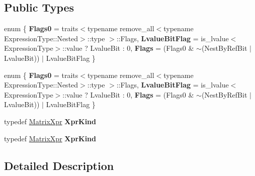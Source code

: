 \subsection*{Public Types}
\begin{DoxyCompactItemize}
\item 
\mbox{\label{struct_eigen_1_1internal_1_1traits_3_01_matrix_wrapper_3_01_expression_type_01_4_01_4_adc3afb0fa2ee62a2a9e33975abed9b67}} 
enum \{ {\bfseries Flags0} = traits$<$typename remove\+\_\+all$<$typename Expression\+Type\+:\+:Nested$>$\+:\+:type $>$\+:\+:Flags, 
{\bfseries Lvalue\+Bit\+Flag} = is\+\_\+lvalue$<$Expression\+Type$>$\+:\+:value ? Lvalue\+Bit \+: 0, 
{\bfseries Flags} = (Flags0 \& $\sim$(Nest\+By\+Ref\+Bit $\vert$ Lvalue\+Bit)) $\vert$ Lvalue\+Bit\+Flag
 \}
\item 
\mbox{\label{struct_eigen_1_1internal_1_1traits_3_01_matrix_wrapper_3_01_expression_type_01_4_01_4_ac30ca49ecdc1258e2e53b6a0713370b7}} 
enum \{ {\bfseries Flags0} = traits$<$typename remove\+\_\+all$<$typename Expression\+Type\+:\+:Nested$>$\+:\+:type $>$\+:\+:Flags, 
{\bfseries Lvalue\+Bit\+Flag} = is\+\_\+lvalue$<$Expression\+Type$>$\+:\+:value ? Lvalue\+Bit \+: 0, 
{\bfseries Flags} = (Flags0 \& $\sim$(Nest\+By\+Ref\+Bit $\vert$ Lvalue\+Bit)) $\vert$ Lvalue\+Bit\+Flag
 \}
\item 
\mbox{\label{struct_eigen_1_1internal_1_1traits_3_01_matrix_wrapper_3_01_expression_type_01_4_01_4_ae401c17b667c6513b992141a9f43691f}} 
typedef \hyperlink{struct_eigen_1_1_matrix_xpr}{Matrix\+Xpr} {\bfseries Xpr\+Kind}
\item 
\mbox{\label{struct_eigen_1_1internal_1_1traits_3_01_matrix_wrapper_3_01_expression_type_01_4_01_4_ae401c17b667c6513b992141a9f43691f}} 
typedef \hyperlink{struct_eigen_1_1_matrix_xpr}{Matrix\+Xpr} {\bfseries Xpr\+Kind}
\end{DoxyCompactItemize}


\subsection{Detailed Description}
